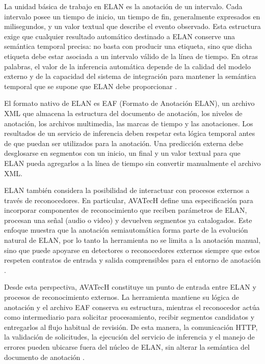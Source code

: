 \documentclass[11pt,a4paper]{article}
\begin{document}
La unidad básica de trabajo en ELAN es la anotación de un intervalo. Cada intervalo posee un tiempo de inicio, un tiempo de fin, generalmente expresados en milisegundos, y un valor textual que describe el evento observado. Esta estructura exige que cualquier resultado automático destinado a ELAN conserve una semántica temporal precisa: no basta con producir una etiqueta, sino que dicha etiqueta debe estar asociada a un intervalo válido de la línea de tiempo. En otras palabras, el valor de la
inferencia automática depende de la calidad del modelo externo y de la capacidad del sistema
de integración para mantener la semántica temporal que se supone que ELAN debe proporcionar \cite{wittenburg2006elan}.

El formato nativo de ELAN es EAF (Formato de Anotación ELAN), un archivo XML que almacena la estructura del documento de anotación, los niveles de anotación, los archivos multimedia, las marcas de tiempo y las anotaciones\cite{wittenburg2006elan}. Los resultados de un servicio de inferencia deben respetar esta lógica temporal antes de que puedan ser utilizados para la anotación. Una predicción externa debe desglosarse en segmentos con un inicio, un final y un valor textual para que ELAN pueda agregarlos a la línea de tiempo sin convertir manualmente el archivo XML.

ELAN también considera la posibilidad de interactuar con procesos externos a través de reconocedores. En particular, AVATecH define una especificación para incorporar componentes de reconocimiento que reciben parámetros de ELAN, procesan una señal (audio o video) y devuelven segmentos ya catalogados. Este enfoque muestra que la anotación semiautomática forma parte de la evolución natural de ELAN, por lo tanto la herramienta no se limita a la anotación manual, sino que puede apoyarse en detectores o reconocedores externos siempre que estos respeten contratos de entrada y salida comprensibles para el entorno de anotación \cite{auer2010elan,auer2014avatech}.

Desde esta perspectiva, AVATecH constituye un punto de entrada entre ELAN y procesos de reconocimiento externos. La herramienta mantiene su lógica de anotación y el archivo EAF conserva su estructura, mientras el reconocedor actúa como intermediario para solicitar procesamiento, recibir segmentos candidatos y entregarlos al flujo habitual de revisión. De esta manera, la comunicación HTTP, la validación de solicitudes, la ejecución del servicio de inferencia y el manejo de errores pueden ubicarse fuera del núcleo de ELAN, sin alterar la semántica del documento de anotación \cite{auer2014avatech}.
\end{document}
